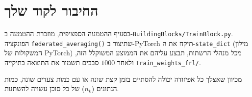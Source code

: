 \documentclass[11pt,a4paper]{article}
\begin{document}
\section{החיבור לקוד שלך}

בסעיף ההטמעה הספציפית, מוזכרת ההטמעה ב-\texttt{BuildingBlocks/TrainBlock.py}.
הפונקציה \texttt{federated\_averaging()} שתיצור ב-PyTorch תיקח את ה-\texttt{state\_dict} (מילון המשקולות של PyTorch) מכל מנהלי הרשתות, תבצע עליהם את הממוצע המשוקלל הזה, ולאחר $1000$ סבבים תשמור את התוצאה בתיקייה \texttt{Train\_weights\_frl/}.

מכיוון שאצלך כל אפיזודה יכולה להסתיים בזמן קצת שונה או עם כמות צעדים שונה, כמות הנתונים ($n_k$) של כל סוכן עשויה להשתנות.
\end{document}
